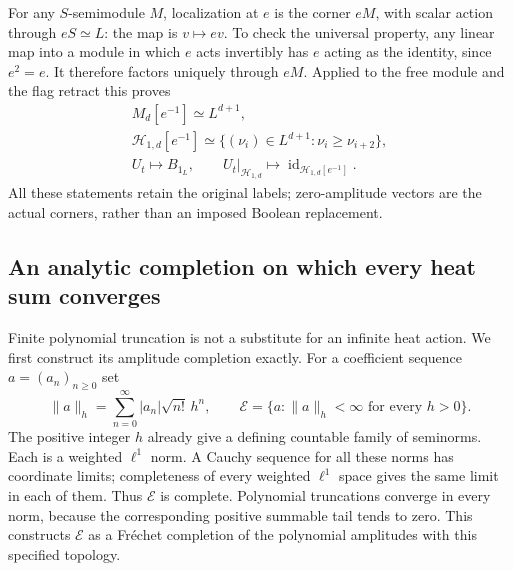 For any $S$-semimodule $M$, localization at $e$ is the corner
$eM$, with scalar action through $eS\simeq L$:
the map is $v\mapsto ev$. To check the universal property,
any linear map into a module in which $e$ acts invertibly
has $e$ acting as the identity, since $e^2=e$.
It therefore factors uniquely through $eM$.
Applied to the free module and the flag retract this proves
\begin{equation}\tag{HSL14}
 \begin{gathered}
 M_d[e^{-1}]\simeq L^{d+1},\\
 \mathcal H_{1,d}[e^{-1}]
   \simeq\{(\nu_i)\in L^{d+1}:\nu_i\ge\nu_{i+2}\},\\
 U_t\longmapsto B_{1_L},\qquad
 U_t|_{\mathcal H_{1,d}}\longmapsto
       \operatorname{id}_{\mathcal H_{1,d}[e^{-1}]} .
 \end{gathered}
\end{equation}
All these statements retain the original labels; zero-amplitude
vectors are the actual corners, rather than an imposed Boolean
replacement.

\subsection{An analytic completion on which every heat sum converges}

Finite polynomial truncation is not a substitute for an infinite
heat action. We first construct its amplitude completion exactly.
For a coefficient sequence $a=(a_n)_{n\ge0}$ set
\begin{equation}\tag{HSL15}
 \|a\|_h=\sum_{n=0}^{\infty}|a_n|\sqrt{n!}\,h^n,\qquad
 \mathcal E=\{a:\|a\|_h<\infty\text{ for every }h>0\}.
\end{equation}
The positive integer $h$ already give a defining countable
family of seminorms. Each is a weighted $\ell^1$ norm.
A Cauchy sequence for all these norms has coordinate limits;
completeness of every weighted $\ell^1$ space gives the same
limit in each of them. Thus $\mathcal E$ is complete.
Polynomial truncations converge in every norm, because the
corresponding positive summable tail tends to zero.
This constructs $\mathcal E$ as a Fréchet completion of the
polynomial amplitudes with this specified topology.

